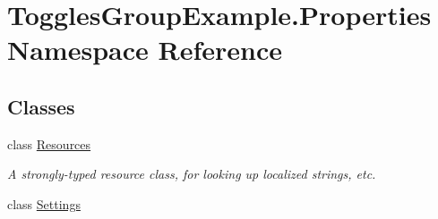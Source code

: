 \hypertarget{namespace_toggles_group_example_1_1_properties}{}\section{Toggles\+Group\+Example.\+Properties Namespace Reference}
\label{namespace_toggles_group_example_1_1_properties}
\subsection*{Classes}
\begin{DoxyCompactItemize}
\item 
class \mbox{\hyperlink{class_toggles_group_example_1_1_properties_1_1_resources}{Resources}}
\begin{DoxyCompactList}\small\item\em A strongly-\/typed resource class, for looking up localized strings, etc. \end{DoxyCompactList}\item 
class \mbox{\hyperlink{class_toggles_group_example_1_1_properties_1_1_settings}{Settings}}
\end{DoxyCompactItemize}
